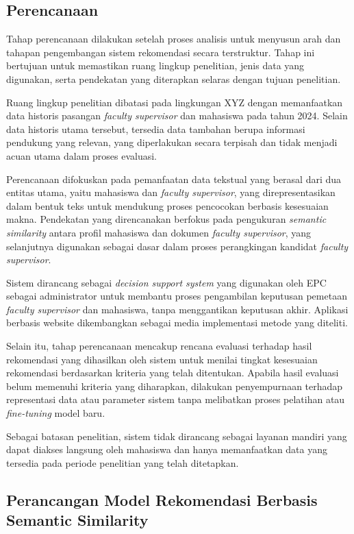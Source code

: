 \subsection{Perencanaan}\label{perencanaan}

Tahap perencanaan dilakukan setelah proses analisis untuk menyusun arah dan tahapan pengembangan sistem rekomendasi secara terstruktur. Tahap ini bertujuan untuk memastikan ruang lingkup penelitian, jenis data yang digunakan, serta pendekatan yang diterapkan selaras dengan tujuan penelitian.

Ruang lingkup penelitian dibatasi pada lingkungan XYZ dengan memanfaatkan data historis pasangan \textit{faculty supervisor} dan mahasiswa pada tahun 2024. Selain data historis utama tersebut, tersedia data tambahan berupa informasi pendukung yang relevan, yang diperlakukan secara terpisah dan tidak menjadi acuan utama dalam proses evaluasi.

Perencanaan difokuskan pada pemanfaatan data tekstual yang berasal dari dua entitas utama, yaitu mahasiswa dan \textit{faculty supervisor}, yang direpresentasikan dalam bentuk teks untuk mendukung proses pencocokan berbasis kesesuaian makna. Pendekatan yang direncanakan berfokus pada pengukuran \textit{semantic similarity} antara profil mahasiswa dan dokumen \textit{faculty supervisor}, yang selanjutnya digunakan sebagai dasar dalam proses perangkingan kandidat \textit{faculty supervisor}.

Sistem dirancang sebagai \textit{decision support system} yang digunakan oleh EPC sebagai administrator untuk membantu proses pengambilan keputusan pemetaan \textit{faculty supervisor} dan mahasiswa, tanpa menggantikan keputusan akhir. Aplikasi berbasis website dikembangkan sebagai media implementasi metode yang diteliti.

Selain itu, tahap perencanaan mencakup rencana evaluasi terhadap hasil rekomendasi yang dihasilkan oleh sistem untuk menilai tingkat kesesuaian rekomendasi berdasarkan kriteria yang telah ditentukan. Apabila hasil evaluasi belum memenuhi kriteria yang diharapkan, dilakukan penyempurnaan terhadap representasi data atau parameter sistem tanpa melibatkan proses pelatihan atau \textit{fine-tuning} model baru.

Sebagai batasan penelitian, sistem tidak dirancang sebagai layanan mandiri yang dapat diakses langsung oleh mahasiswa dan hanya memanfaatkan data yang tersedia pada periode penelitian yang telah ditetapkan.

\subsection{Perancangan Model Rekomendasi Berbasis Semantic Similarity}\label{perancangan-model-rekomendasi-berbasis-semantic-similarity}

